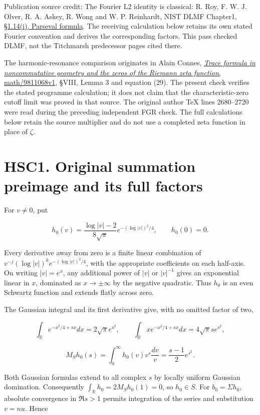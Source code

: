 Publication source credit: The Fourier L2 identity is classical: R. Roy,
F. W. J. Olver, R. A. Askey, R. Wong and W. P. Reinhardt, NIST DLMF
Chapter1, \href{https://dlmf.nist.gov/1.14\#i}{§1.14(i), Parseval
formula}. The receiving calculation below retains its own stated Fourier
convention and derives the corresponding factors. This pass checked
DLMF, not the Titchmarsh predecessor pages cited there.

The harmonic-resonance comparison originates in Alain Connes,
\href{https://arxiv.org/abs/math/9811068v1}{\emph{Trace formula in
noncommutative geometry and the zeros of the Riemann zeta function},
math/9811068v1}, §VIII, Lemma 3 and equation (29). The present check
verifies the stated programme calculation; it does not claim that the
characteristic-zero cutoff limit was proved in that source. The original
author TeX lines 2680--2720 were read during the preceding independent
FGR check. The full calculations below retain the source multiplier and
do not use a completed zeta function in place of \(\zeta\).

\section{HSC1. Original summation preimage and its full
factors}\label{hsc1.-original-summation-preimage-and-its-full-factors}

For \(v\ne0\), put

\[
 h_0(v)=\frac{\log|v|-2}{8\sqrt\pi}
 e^{-(\log|v|)^2/4},\qquad h_0(0)=0.
\]

Every derivative away from zero is a finite linear combination of
\(v^{-j}(\log|v|)^k e^{-(\log|v|)^2/4}\), with the appropriate
coefficients on each half-axis. On writing \(|v|=e^x\), any additional
power of \(|v|\) or \(|v|^{-1}\) gives an exponential linear in \(x\),
dominated as \(x\to\pm\infty\) by the negative quadratic. Thus \(h_0\)
is an even Schwartz function and extends flatly across zero.

The Gaussian integral and its first derivative give, with no omitted
factor of two,

\[
 \int_{\mathbb R}e^{-x^2/4+sx}dx=2\sqrt\pi e^{s^2},\qquad
 \int_{\mathbb R}x e^{-x^2/4+sx}dx=4\sqrt\pi s e^{s^2},
\]

\[
 M_Sh_0(s)=\int_0^\infty h_0(v)v^s\frac{dv}{v}
 =\frac{s-1}{2}e^{s^2}.
\tag{HSC1.1}
\]

Both Gaussian formulas extend to all complex \(s\) by locally uniform
Gaussian domination. Consequently \(\int_{\mathbb R}h_0=2M_Sh_0(1)=0\),
so \(h_0\in S\). For \(b_0=\Sigma h_0\), absolute convergence in
\(\Re s>1\) permits integration of the series and substitution \(v=nu\).
Hence

